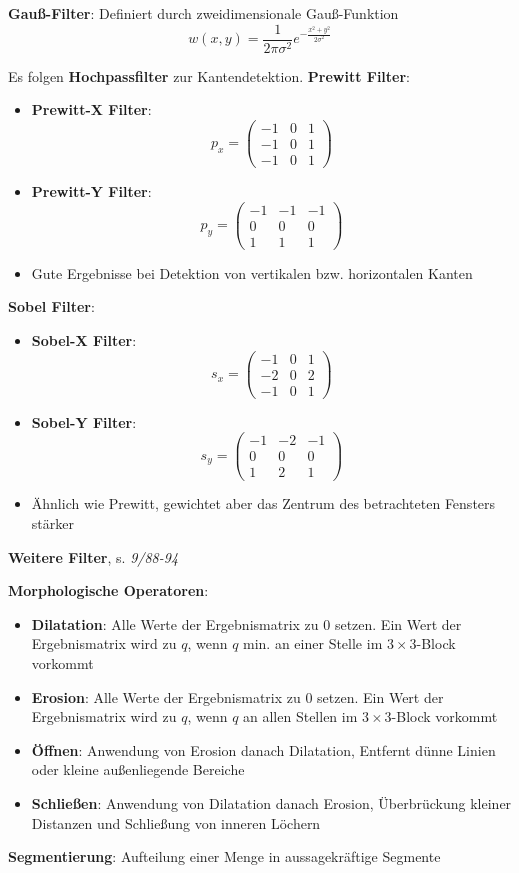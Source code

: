 \textbf{Gauß-Filter}: Definiert durch zweidimensionale Gauß-Funktion
$$w(x,y)=\frac{1}{2\pi\sigma^2}e^{-\frac{x^2+y^2}{2\sigma^2}}$$

Es folgen \textbf{Hochpassfilter} zur Kantendetektion.
\textbf{Prewitt Filter}:
\begin{itemize}
	\item \textbf{Prewitt-X Filter}: $$p_x=\left(
	\begin{matrix}
		-1 & 0 & 1 \\
		-1 & 0 & 1 \\
		-1 & 0 & 1 
	\end{matrix}\right)$$
	\item \textbf{Prewitt-Y Filter}: $$p_y=\left(
	\begin{matrix}
		-1 & -1 & -1 \\
		0 & 0 & 0 \\
		1 & 1 & 1 
	\end{matrix}\right)$$
	\item Gute Ergebnisse bei Detektion von vertikalen bzw. horizontalen Kanten
\end{itemize}

\textbf{Sobel Filter}:
\begin{itemize}
	\item \textbf{Sobel-X Filter}: $$s_x=\left(
	\begin{matrix}
		-1 & 0 & 1 \\
		-2 & 0 & 2 \\
		-1 & 0 & 1 
	\end{matrix}\right)$$
	\item \textbf{Sobel-Y Filter}: $$s_y=\left(
	\begin{matrix}
		-1 & -2 & -1 \\
		0 & 0 & 0 \\
		1 & 2 & 1 
	\end{matrix}\right)$$
	\item Ähnlich wie Prewitt, gewichtet aber das Zentrum des betrachteten Fensters stärker
\end{itemize}

\textbf{Weitere Filter}, s. \textit{9/88-94}\\
\pagebreak

\textbf{Morphologische Operatoren}:
\begin{itemize}
	\item \textbf{Dilatation}: Alle Werte der Ergebnismatrix zu 0 setzen. Ein Wert der Ergebnismatrix wird zu $q$, wenn $q$ min. an einer Stelle im $3\times 3$-Block vorkommt
	\item \textbf{Erosion}: Alle Werte der Ergebnismatrix zu 0 setzen. Ein Wert der Ergebnismatrix wird zu $q$, wenn $q$ an allen Stellen im $3\times 3$-Block vorkommt
	\item \textbf{Öffnen}: Anwendung von Erosion danach Dilatation, Entfernt dünne Linien oder kleine außenliegende Bereiche
	\item \textbf{Schließen}: Anwendung von Dilatation danach Erosion, Überbrückung kleiner Distanzen und Schließung von inneren Löchern
\end{itemize}
\bigskip
\textbf{Segmentierung}: Aufteilung einer Menge in aussagekräftige Segmente

